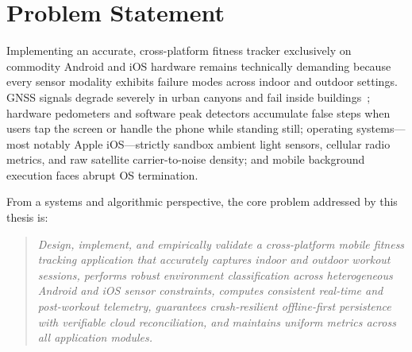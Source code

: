 \section{Problem Statement}
Implementing an accurate, cross-platform fitness tracker exclusively on commodity Android and iOS hardware remains technically demanding because every sensor modality exhibits failure modes across indoor and outdoor settings. GNSS signals degrade severely in urban canyons and fail inside buildings~\cite{merry2019gps,zandbergen2011gps}; hardware pedometers and software peak detectors accumulate false steps when users tap the screen or handle the phone while standing still; operating systems---most notably Apple iOS---strictly sandbox ambient light sensors, cellular radio metrics, and raw satellite carrier-to-noise density; and mobile background execution faces abrupt OS termination.

From a systems and algorithmic perspective, the core problem addressed by this thesis is:
\begin{quote}
\textit{Design, implement, and empirically validate a cross-platform mobile fitness tracking application that accurately captures indoor and outdoor workout sessions, performs robust environment classification across heterogeneous Android and iOS sensor constraints, computes consistent real-time and post-workout telemetry, guarantees crash-resilient offline-first persistence with verifiable cloud reconciliation, and maintains uniform metrics across all application modules.}
\end{quote}

